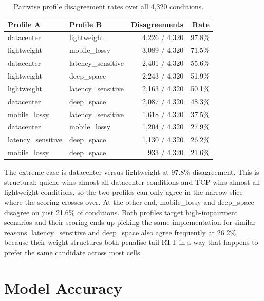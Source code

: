 \begin{table}[htbp]
  \centering
  \caption{Pairwise profile disagreement rates over all 4,320 conditions.}
  \label{tab:disagreement}
  \begin{tabular}{llrr}
    \hline
    \textbf{Profile A} & \textbf{Profile B} & \textbf{Disagreements} & \textbf{Rate} \\
    \hline
    datacenter         & lightweight         & 4,226 / 4,320 &  97.8\% \\
    lightweight        & mobile\_lossy       & 3,089 / 4,320 &  71.5\% \\
    datacenter         & latency\_sensitive  & 2,401 / 4,320 &  55.6\% \\
    lightweight        & deep\_space         & 2,243 / 4,320 &  51.9\% \\
    lightweight        & latency\_sensitive  & 2,163 / 4,320 &  50.1\% \\
    datacenter         & deep\_space         & 2,087 / 4,320 &  48.3\% \\
    mobile\_lossy      & latency\_sensitive  & 1,618 / 4,320 &  37.5\% \\
    datacenter         & mobile\_lossy       & 1,204 / 4,320 &  27.9\% \\
    latency\_sensitive & deep\_space         & 1,130 / 4,320 &  26.2\% \\
    mobile\_lossy      & deep\_space         &   933 / 4,320 &  21.6\% \\
    \hline
  \end{tabular}
\end{table}

The extreme case is datacenter versus lightweight at 97.8\% disagreement.
This is structural: quiche wins almost all datacenter conditions and TCP wins
almost all lightweight conditions, so the two profiles can only agree in the
narrow slice where the scoring crosses over. At the other end, mobile\_lossy
and deep\_space disagree on just 21.6\% of conditions. Both profiles target
high-impairment scenarios and their scoring ends up picking the same
implementation for similar reasons. latency\_sensitive and deep\_space also
agree frequently at 26.2\%, because their weight structures both penalise
tail RTT in a way that happens to prefer the same candidate across most cells.

\section{Model Accuracy}
\label{sec:model-accuracy}


